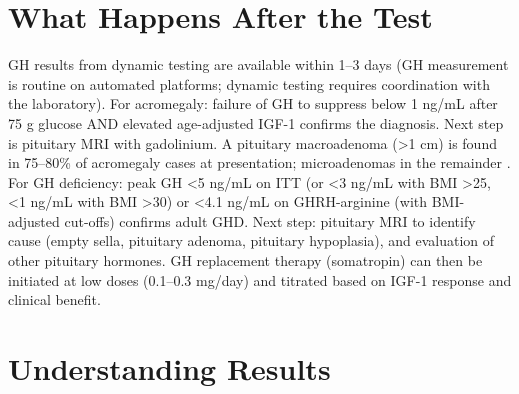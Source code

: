 \section*{What Happens After the Test}
GH results from dynamic testing are available within 1--3 days (GH measurement is routine on automated platforms; dynamic testing requires coordination with the laboratory). For acromegaly: failure of GH to suppress below 1 ng/mL after 75 g glucose AND elevated age-adjusted IGF-1 confirms the diagnosis. Next step is pituitary MRI with gadolinium. A pituitary macroadenoma (>1 cm) is found in 75--80\% of acromegaly cases at presentation; microadenomas in the remainder \cite{melmed2006acromegaly}. For GH deficiency: peak GH <5 ng/mL on ITT (or <3 ng/mL with BMI >25, <1 ng/mL with BMI >30) or <4.1 ng/mL on GHRH-arginine (with BMI-adjusted cut-offs) confirms adult GHD. Next step: pituitary MRI to identify cause (empty sella, pituitary adenoma, pituitary hypoplasia), and evaluation of other pituitary hormones. GH replacement therapy (somatropin) can then be initiated at low doses (0.1--0.3 mg/day) and titrated based on IGF-1 response and clinical benefit.

\section*{Understanding Results}

